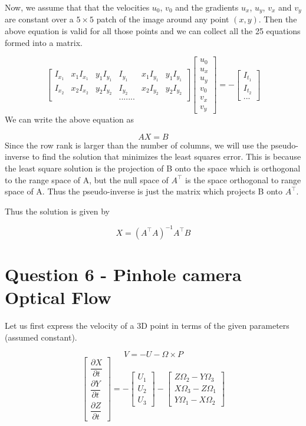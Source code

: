 \documentclass[12pt]{article}
\begin{document}
Now, we assume that that the velocities $u_{0}$, $v_{0}$ and the gradients $u_{x}$, $u_{y}$, $v_{x}$ and $v_{y}$ are constant over a $5\times5$ patch of the image around any point $(x,y)$. Then the above equation is valid for all those points and we can collect all the 25 equations formed into a matrix.

$$
\left[ \begin{matrix} I_{x_{1}} & x_{1}I_{x_{1}} & y_{1}I_{y_{1}} & I_{y_{1}} & x_{1}I_{y_{1}}&y_{1}I_{y_{1}} \\ I_{x_{2}} & x_{2}I_{x_{2}} & y_{2}I_{y_{2}} & I_{y_{2}} & x_{2}I_{y_{2}}&y_{2}I_{y_{2}} \\ & & &.......  \end{matrix} \right] \left[ \begin{matrix} u_{0} \\ u_{x} \\ u_{y} \\ v_{0} \\v_{x}\\v_{y}\end{matrix} \right] = 
-\left[ \begin{matrix}  I_{t_1} \\ I_{t_2} \\ ...\end{matrix} \right]
$$
We can write the above equation as 

$$ AX=B $$
Since the row rank is larger than the number of columns, we will use the pseudo-inverse to find the solution that minimizes the least squares error. This is because the least square solution is the projection of B onto the space which is orthogonal to the range space of A, but the null space of $A^\top$ is the space orthogonal to range space of A. Thus the pseudo-inverse is just the  matrix which projects B onto $A^\top$.

Thus the solution is given by 

$$ X = \left( A^\top A \right)^{-1} A^\top B $$

\section{Question 6 - Pinhole camera Optical Flow}
Let us first express the velocity of a 3D point in terms of the given parameters (assumed constant).

$$ V=-U - \Omega \times P$$
$$ \left[ \begin{matrix} \dfrac {\partial X} {\partial t} \\[9pt] \dfrac {\partial Y} {\partial t} \\[9pt]  \dfrac {\partial Z} {\partial t} \end{matrix} \right] = - \left[ \begin{matrix}  U_1 \\ U_2 \\ U_3 \end{matrix} \right] - \left[ \begin{matrix}  Z\Omega_2 - Y\Omega_3 \\ X\Omega_3 - Z\Omega_1 \\ Y\Omega_1 - X\Omega_2 \end{matrix} \right]$$
\end{document}
